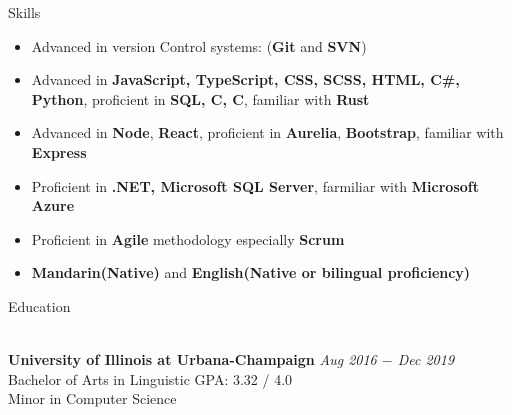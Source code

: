 \documentclass{resume}
\begin{document}
\begin{rSection}{Skills}

\begin{itemize}

    \item   Advanced in version Control systems: (\textbf{Git} and \textbf{SVN})
    \item	Advanced in \textbf{JavaScript, TypeScript, CSS, SCSS, HTML, C\#, Python}, proficient in \textbf{SQL, C, C\boldsymbol{++}}, familiar with \textbf{Rust}
    \item	Advanced in \textbf{Node}, \textbf{React}, proficient in \textbf{Aurelia}, \textbf{Bootstrap}, familiar with \textbf{Express}
    \item	Proficient in \textbf{.NET, Microsoft SQL Server}, farmiliar with \textbf{Microsoft Azure}
    \item	Proficient in \textbf{Agile} methodology especially \textbf{Scrum}
    \item   \textbf{Mandarin(Native)} and \textbf{English(Native or bilingual proficiency)}

\end{itemize}

\end{rSection}

\begin{rSection}{Education}

    \\{\bf University of Illinois at Urbana-Champaign} \hfill {\em Aug 2016 $-$ Dec 2019} 
    \\ Bachelor of Arts in Linguistic\hfill { GPA: 3.32 / 4.0 }
    \\ Minor in Computer Science

\end{rSection}
\end{document}

